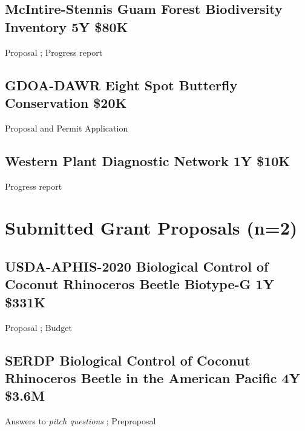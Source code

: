 \subsection{McIntire-Stennis Guam Forest Biodiversity Inventory 5Y \$80K}
\label{McIntire-Stennis Guam Forest Biodiversity Inventory}
\begin{refsection}
Proposal \cite{moore_mcintire-stennis_2018};
Progress report \cite{moore_guam_2020}
	\printbibliography[heading=none]
\end{refsection}

\subsection{GDOA-DAWR Eight Spot Butterfly Conservation \$20K}
\label{eightspot}
\begin{refsection}
Proposal and Permit Application \cite{aubrey_moore_application_2016}
\printbibliography[heading=none]
\end{refsection}

\subsection{Western Plant Diagnostic Network 1Y \$10K}
\label{WPDN}
\begin{refsection}
Progress report \cite{moore_npdn_2018}
\printbibliography[heading=none]
\end{refsection}


\newpage
\section{Submitted Grant Proposals (n=2)}

\subsection{USDA-APHIS-2020 Biological Control of Coconut Rhinoceros Beetle Biotype-G 1Y \$331K}
\label{USDA-APHIS-2020}
\begin{refsection}
Proposal \cite{moore_fy20_2019};
Budget \cite{moore_fy20_2019-1} 
\printbibliography[heading=none]
\end{refsection}

\subsection{SERDP Biological Control of Coconut Rhinoceros Beetle in the American Pacific 4Y \$3.6M}
\label{SERDP}
\begin{refsection}
Answers to \textit{pitch questions} \cite{moore_aubreymoore/answers--pitch-questions_2019}; 
Preproposal \cite{moore_serdp_2020}	
\printbibliography[heading=none]
\end{refsection}


